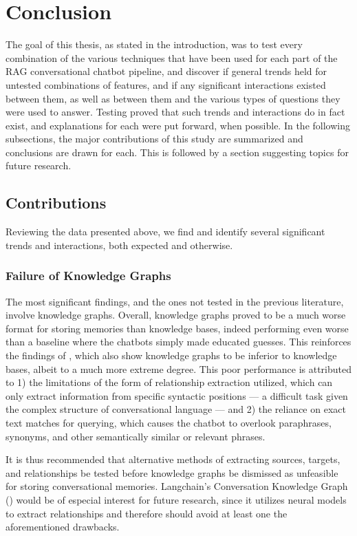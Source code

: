 \section{Conclusion}

The goal of this thesis, as stated in the introduction, was to test every combination of the various techniques that have been used for each part of the RAG conversational chatbot pipeline, and discover if general trends held for untested combinations of features, and if any significant interactions existed between them, as well as between them and the various types of questions they were used to answer. Testing proved that such trends and interactions do in fact exist, and explanations for each were put forward, when possible. In the following subsections, the major contributions of this study are summarized and conclusions are drawn for each. This is followed by a section suggesting topics for future research.


\subsection{Contributions}

Reviewing the data presented above, we find and identify several significant trends and interactions, both expected and otherwise. 


\subsubsection{Failure of Knowledge Graphs}

The most significant findings, and the ones not tested in the previous literature, involve knowledge graphs. Overall, knowledge graphs proved to be a much worse format for storing memories than knowledge bases, indeed performing even worse than a baseline where the chatbots simply made educated guesses. This reinforces the findings of \cite{Sanmartin2024}, which also show knowledge graphs to be inferior to knowledge bases, albeit to a much more extreme degree. This poor performance is attributed to 1) the limitations of the form of relationship extraction utilized, which can only extract information from specific syntactic positions — a difficult task given the complex structure of conversational language — and 2) the reliance on exact text matches for querying, which causes the chatbot to overlook paraphrases, synonyms, and other semantically similar or relevant phrases. 

It is thus recommended that alternative methods of extracting sources, targets, and relationships be tested before knowledge graphs be dismissed as unfeasible for storing conversational memories. Langchain's Conversation Knowledge Graph (\cite{Langchain}) would be of especial interest for future research, since it utilizes neural models to extract relationships and therefore should avoid at least one the aforementioned drawbacks.


